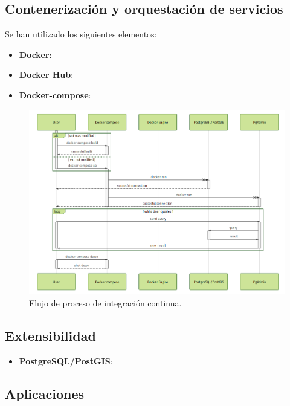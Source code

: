 \subsection{Contenerización y orquestación de servicios}





Se han utilizado los siguientes elementos:
\begin{itemize}
\item\textbf{Docker}: 
\item\textbf{Docker Hub}: 
\item\textbf{Docker-compose}: 
\end{itemize}




\begin{figure}
\begin{center}
\includegraphics[width=\textwidth]{Metodologia/Figs/ci.png}
\caption{Flujo de proceso de integración continua. \label{fig:ci}}
\end{center}
\end{figure}


\subsection{Extensibilidad}



\begin{itemize}
\item\textbf{PostgreSQL/PostGIS}: 
\end{itemize}

\subsection{Aplicaciones}

